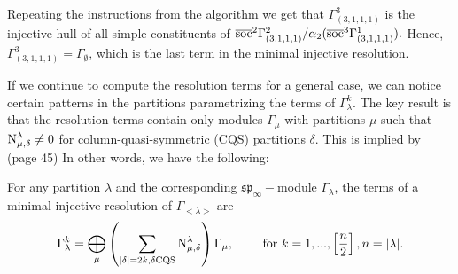 \documentclass[main.tex]{subfiles}
\begin{document}
\begin{ex}
 Repeating the instructions from the algorithm
we get that $\Gamma_{(3,1,1,1)}^3$ is the injective hull of all simple constituents of 
$\overline{\text{soc}}^{2}\Gamma_{(3,1,1,1)}^2/\alpha_2(\overline{\text{soc}}^{3}\Gamma_{(3,1,1,1)}^1).$ 
Hence, $\Gamma_{(3,1,1,1)}^{3}=\Gamma_{\emptyset}$, which is the last term in the minimal injective resolution.
\end{ex}

\bigskip



If we continue to compute the resolution terms for a general case, we can notice certain patterns in the partitions parametrizing the terms of $\Gamma_\lambda^k$. The key result is that the resolution terms contain only modules $\Gamma_\mu$ with partitions $\mu$ such that $\text{N}^{\lambda}_{\mu, \delta}\neq 0$ for column-quasi-symmetric (CQS) partitions $\delta$. This is implied by \cite{SAM_2015} (page 45) In other words, we have the following: 

\bigskip
\begin{thm}
\label{thm-res}
    For any partition $\lambda$ and the corresponding $\mathfrak{sp}_\infty-$module $\Gamma_\lambda$, the terms of a minimal injective resolution of $\Gamma_{<\lambda>}$ are 
    $$
    \Gamma_\lambda^{k} = \bigoplus\limits_{\mu} \left( \sum\limits_{|\delta|=2k ,  \delta \text{CQS}} \text{N}^{\lambda}_{\mu, \delta} \right) \Gamma_{\mu},
    \hspace{0.7cm} \text{ for } k = 1, ..., \left[\frac{n}{2}\right], n = |\lambda|.$$
\end{thm}

\bigskip
\end{document}
